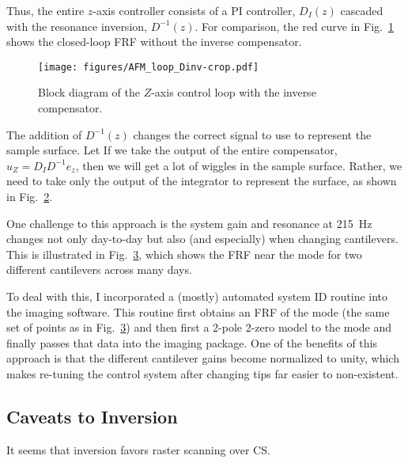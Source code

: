 \documentclass[11pt]{article}
\begin{document}
\begin{figure}[b!]
  \centering
  
  \caption{}
  \label{fig:z_control}
\end{figure}
Thus, the entire $z$-axis controller consists of a PI controller, $D_I(z)$ cascaded with the resonance inversion, $D^{-1}(z)$. For comparison, the red curve in Fig.~\ref{fig:z_control} shows the closed-loop FRF without the inverse compensator.
\begin{figure}
  \centering
  \texttt{[image: figures/AFM\_loop\_Dinv-crop.pdf]}
  \caption{Block diagram of the $Z$-axis control loop with the inverse compensator.}
  \label{fig:afm_bd_dinv}
\end{figure}
The addition of $D^{-1}(z)$ changes the correct signal to use to represent the sample surface. Let 
If we take the output of the entire compensator, $u_Z=D_ID^{-1}e_z$, then we will get a lot of wiggles in the sample surface. Rather, we need to take only the output of the integrator to represent the surface, as shown in Fig.~\ref{fig:afm_bd_dinv}.


One challenge to this approach is the system gain and resonance at 215~Hz changes not only day-to-day but also (and especially) when changing cantilevers. This is illustrated in Fig.~\ref{fig:z_evolution}, which shows the FRF near the mode for two different cantilevers across many days.

\begin{figure}
  \centering
  
  \caption{}
  \label{fig:z_evolution}
\end{figure}
To deal with this, I incorporated a (mostly) automated system ID routine into the imaging software. This routine first obtains an FRF of the mode (the same set of points as in Fig.~\ref{fig:z_evolution}) and then first a 2-pole 2-zero model to the mode and finally passes that data into the imaging package. One of the benefits of this approach is that the different cantilever gains become normalized to unity, which makes re-tuning the control system after changing tips far easier to non-existent.

\subsection{Caveats to Inversion}
It seems that inversion favors raster scanning over CS.
\end{document}
